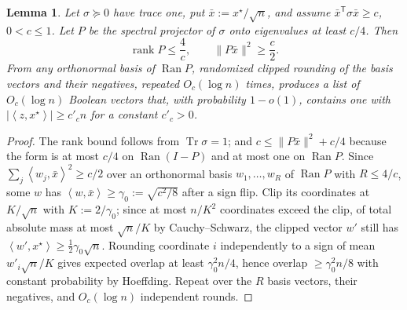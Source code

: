 \documentclass[11pt]{article}
\newtheorem{lemma}[lemma]{Lemma}
\theoremstyle{definition}
\theoremstyle{remark}
\newcommand{\1}{\mathbf 1}
\newcommand{\xstar}{{x^\star}}
\newcommand{\ip}[2]{\left\langle #1,#2\right\rangle}
\DeclareMathOperator{\Tr}{Tr}
\DeclareMathOperator{\Ran}{Ran}
\DeclareMathOperator{\rank}{rank}
\numberwithin{equation}{section}
\begin{document}
\begin{lemma}\label{lem:rounding}
Let $\sigma\succeq0$ have trace one, put $\bar x:=\xstar/\sqrt n$, and
assume $\bar x^{\mathsf T}\sigma\bar x\ge c$, $0<c\le1$.  Let $P$
be the spectral projector of $\sigma$ onto eigenvalues at least $c/4$.
Then
\begin{equation}\label{eq:rounding-projector}
 \rank P\le\frac4c,
 \qquad
 \|P\bar x\|^2\ge\frac c2.
\end{equation}
From any orthonormal basis of $\Ran P$, randomized clipped rounding of
the basis vectors and their negatives, repeated $O_c(\log n)$ times,
produces a list of $O_c(\log n)$ Boolean vectors that, with probability
$1-o(1)$, contains one with
$|\ip z{\xstar}|\ge c'_cn$ for a constant $c'_c>0$.
\end{lemma}
\begin{proof}
The rank bound follows from $\Tr\sigma=1$; and
$c\le\|P\bar x\|^2+c/4$ because the form is at most $c/4$ on
$\Ran(I-P)$ and at most one on $\Ran P$.  Since
$\sum_j\ip{w_j}{\bar x}^2\ge c/2$ over an orthonormal basis
$w_1,\ldots,w_R$ of $\Ran P$ with $R\le4/c$, some $w$ has
$\ip w{\bar x}\ge\gamma_0:=\sqrt{c^2/8}$ after a sign flip.  Clip its
coordinates at $K/\sqrt n$ with $K:=2/\gamma_0$; since at most $n/K^2$
coordinates exceed the clip, of total absolute mass at most
$\sqrt n/K$ by Cauchy--Schwarz, the clipped vector $w'$ still has
$\ip{w'}{\xstar}\ge\tfrac12\gamma_0\sqrt n$.  Rounding coordinate $i$
independently to a sign of mean $w'_i\sqrt n/K$ gives expected overlap
at least $\gamma_0^2n/4$, hence overlap $\ge\gamma_0^2n/8$ with
constant probability by Hoeffding.  Repeat over the $R$ basis vectors,
their negatives, and $O_c(\log n)$ independent rounds.
\end{proof}
\end{document}
